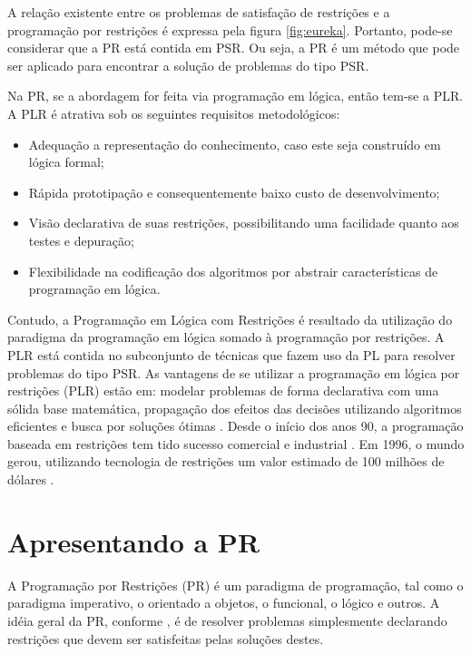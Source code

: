 A relação existente entre os problemas de satisfação de restrições e a programação por restrições é expressa pela figura \ref{fig:eureka}. Portanto, pode-se considerar que a PR está contida em PSR. Ou seja, a PR é um método que pode ser aplicado para encontrar a solução de problemas do tipo PSR.

Na PR, se a abordagem for feita via programação em lógica, então tem-se a PLR. A PLR é atrativa sob os seguintes requisitos metodológicos:

\begin{itemize}
\item Adequação a representação do conhecimento, caso este seja construído em lógica formal;
\item Rápida prototipação e consequentemente baixo custo de desenvolvimento;
\item Visão declarativa de suas restrições, possibilitando uma facilidade quanto aos testes e depuração;
\item Flexibilidade na codificação dos algoritmos por abstrair características de programação em lógica.
\end{itemize}

Contudo, a Programação em Lógica com Restrições é resultado da utilização do paradigma da programação em lógica somado à programação por restrições. A PLR está contida no subconjunto de técnicas que fazem uso da PL para resolver problemas do tipo PSR. As vantagens de se utilizar a programação em lógica por restrições (PLR) estão em: modelar problemas de forma declarativa com uma sólida base matemática, propagação dos efeitos das decisões utilizando algoritmos eficientes e busca por soluções ótimas \cite{fruewirth2003}. Desde o início dos anos 90, a programação baseada em restrições tem tido sucesso comercial e industrial \cite{RusNorv2010}. Em 1996, o mundo gerou, utilizando tecnologia de restrições um valor estimado de 100 milhões de dólares \cite{fruewirth2003}.



\section{Apresentando a PR}

A Programação por Restrições (PR) é um paradigma de programação, tal como o paradigma imperativo, o orientado a objetos, o funcional, o lógico e outros. A idéia geral da PR, conforme \cite{thom}, é de resolver problemas simplesmente declarando restrições que devem ser satisfeitas pelas soluções destes.

